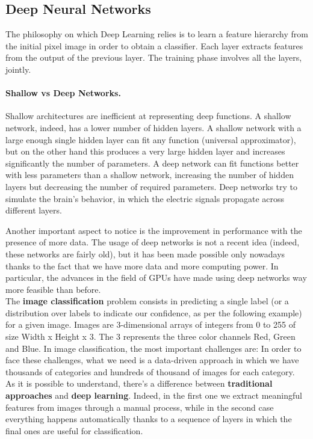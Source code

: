 \subsection{Deep Neural Networks}
The philosophy on which Deep Learning relies is to learn a feature hierarchy from the initial pixel image in order to obtain a classifier. Each layer extracts features from the output of the previous layer. The training phase involves all the layers, jointly.

\paragraph*{Shallow vs Deep Networks.} Shallow architectures are inefficient at representing deep functions. A shallow network, indeed, has a lower number of hidden layers. A shallow network with a large enough single hidden layer can fit any function (universal approximator), but on the other hand this produces a very large hidden layer and increases significantly the number of parameters. A deep network can fit functions better with less parameters than a shallow network, increasing the number of hidden layers but decreasing the number of required parameters. Deep networks try to simulate the brain's behavior, in which the electric signals propagate across different layers.

Another important aspect to notice is the improvement in performance with the presence of more data.
The usage of deep networks is not a recent idea (indeed, these networks are fairly old), but it has been made possible only nowadays thanks to the fact that we have more data and more computing power. In particular, the advances in the field of GPUs have made using deep networks way more feasible than before.\\
The \textbf{image classification} problem consists in predicting a single label (or a distribution over labels to indicate our confidence, as per the following example) for a given image. Images are 3-dimensional arrays of integers from 0 to 255 of size Width x Height x 3. The 3 represents the three color channels Red, Green and Blue.
In image classification, the most important challenges are:
In order to face these challenges, what we need is a data-driven approach in which we have thousands of categories and hundreds of thousand of images for each category.\\
As it is possible to understand, there's a difference between \textbf{traditional approaches} and \textbf{deep learning}. Indeed, in the first one we extract meaningful features from images through a manual process, while in the second case everything happens automatically thanks to a sequence of layers in which the final ones are useful for classification.

